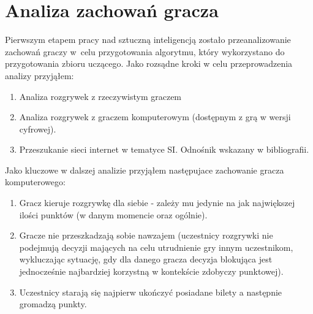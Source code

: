 \documentclass[12pt, oneside]{report}
\begin{document}
\section{Analiza zachowań gracza}
Pierwszym etapem pracy nad sztuczną inteligencją zostało przeanalizowanie zachowań graczy w~celu przygotowania algorytmu, który wykorzystano do przygotowania zbioru uczącego. Jako rozsądne kroki w celu przeprowadzenia analizy przyjąłem:
	\begin{enumerate}
		\item{Analiza rozgrywek z rzeczywistym graczem}
		\item{Analiza rozgrywek z graczem komputerowym (dostępnym z grą w wersji cyfrowej)}.
		\item{Przeszukanie sieci internet w tematyce SI}. Odnośnik wskazany w bibliografii.
	\end{enumerate}
Jako kluczowe w dalszej analizie przyjąłem następujace zachowanie gracza komputerowego:
\begin{enumerate}
	\item Gracz kieruje rozgrywkę dla siebie - zależy mu jedynie na jak największej ilości punktów (w danym momencie oraz ogólnie).
	\item Gracze nie przeszkadzają sobie nawzajem (uczestnicy rozgrywki nie podejmują decyzji mających na celu utrudnienie gry innym uczestnikom, wykluczając sytuację, gdy dla danego gracza decyzja blokująca jest jednocześnie najbardziej korzystną w kontekście zdobyczy punktowej).
	\item Uczestnicy starają się najpierw ukończyć posiadane bilety a następnie gromadzą punkty.
\end{enumerate}
\end{document}

